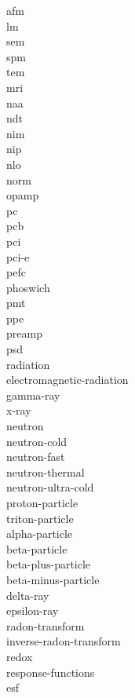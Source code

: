 \documentclass[../main.tex]{subfiles}%
\begin{document}
\gls{afm}\\%
\gls{lm}\\%
\gls{sem}\\%
\gls{spm}\\%
\gls{tem}\\%
\gls{mri}\\%
\gls{naa}\\%
\gls{ndt}\\%
\gls{nim}\\%
\gls{nip}\\%
\gls{nlo}\\%
\gls{norm}\\%
\gls{opamp}\\%
\gls{pc}\\%
\gls{pcb}\\%
\gls{pci}\\%
\gls{pci-e}\\%
\gls{pefc}\\%
\gls{phoswich}\\%
\gls{pmt}\\%
\gls{ppe}\\%
\gls{preamp}\\%
\gls{psd}\\%
\gls{radiation}\\%
\gls{electromagnetic-radiation}\\%
\gls{gamma-ray}\\%
\gls{x-ray}\\%
\gls{neutron}\\%
\gls{neutron-cold}\\%
\gls{neutron-fast}\\%
\gls{neutron-thermal}\\%
\gls{neutron-ultra-cold}\\%
\gls{proton-particle}\\%
\gls{triton-particle}\\%
\gls{alpha-particle}\\%
\gls{beta-particle}\\%
\gls{beta-plus-particle}\\%
\gls{beta-minus-particle}\\%
\gls{delta-ray}\\%
\gls{epsilon-ray}\\%
\gls{radon-transform}\\%
\gls{inverse-radon-transform}\\%
\gls{redox}\\%
\gls{response-functions}\\%
\gls{esf}\\%
\end{document}
